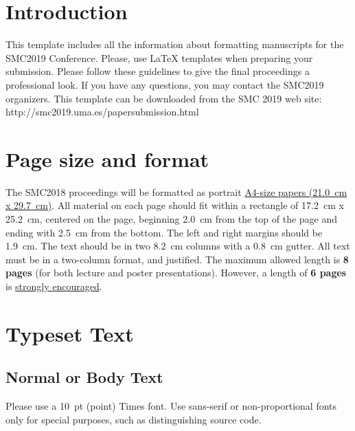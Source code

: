 \documentclass{article}
\title{\papertitle}
\begin{document}
%
\capstartfalse
\maketitle
\capstarttrue
%
\begin{abstract}
The abstract should be placed at the top left column and should contain about 150-200 words.
\end{abstract}
%

\section{Introduction}\label{sec:introduction}
This template includes all the information about formatting manuscripts for 
the SMC2019 Conference.
Please, use \LaTeX{} templates when 
preparing your submission.
Please follow these guidelines to give the final proceedings a professional look.
If you have any questions, you may contact the SMC2019 organizers.
This template can be downloaded from the SMC 2019 web site:\\
http://smc2019.uma.es/papersubmission.html

\section{Page size and format}
\label{sec:page_size}
The SMC2018 proceedings will be formatted as portrait \underline{A4-size papers (21.0~cm x 29.7~cm)}. All material on each page should fit within a rectangle of 17.2~cm x 25.2~cm, centered on the page, beginning 2.0~cm from the top of the page and ending with 2.5~cm from the bottom. The left and right margins should be 1.9~cm. The text should be in two 8.2~cm columns with a 0.8~cm gutter. All text must be in a two-column format, and justified.
The maximum allowed length is {\bf8 pages} (for both lecture and poster presentations). However, a length of {\bf6 pages} is \underline{strongly encouraged}.


\section{Typeset Text}\label{sec:typeset_text}

\subsection{Normal or Body Text}
\label{subsec:body}
Please use a 10~pt (point) Times font. Use sans-serif or non-proportional fonts only for special purposes, such as distinguishing source code.
\end{document}
